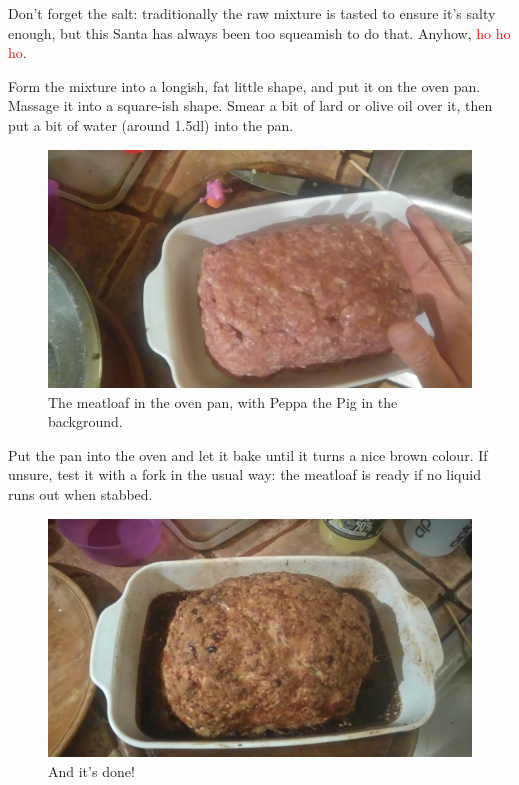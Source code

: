 \documentclass{article}
\begin{document}
Don't forget the salt: traditionally the raw mixture is tasted to ensure it's salty enough, but this Santa has always been too squeamish to do that. Anyhow, \textcolor{red}{ho ho ho}.

Form the mixture into a longish, fat little shape, and put it on the oven pan. Massage it into a square-ish shape. Smear a bit of lard or olive oil over it, then put a bit of water (around 1.5dl) into the pan. 

\begin{figure}[!htbp]
\includegraphics[width=\textwidth]{meatloaf_13}
\caption{The meatloaf in the oven pan, with Peppa the Pig in the background.}
\end{figure}

Put the pan into the oven and let it bake until it turns a nice brown colour. If unsure, test it with a fork in the usual way: the meatloaf is ready if no liquid runs out when stabbed.

\begin{figure}[!htbp]
\includegraphics[width=\textwidth]{meatloaf_17}
\caption{And it's done!}
\end{figure}
\end{document}
